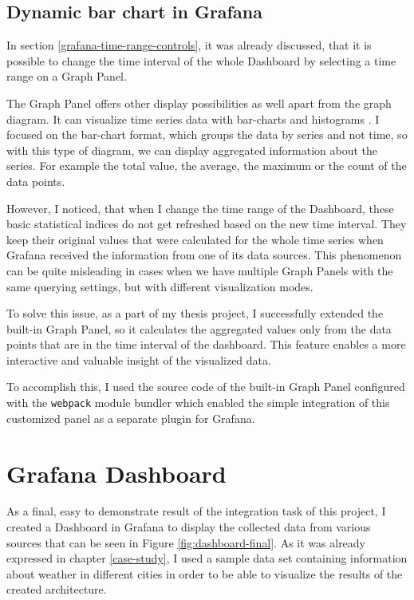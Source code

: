 \subsection{Dynamic bar chart in Grafana} \label{dynamic-barchart}

In section \ref{grafana-time-range-controls}, it was already discussed, that it is possible to change the time interval of the whole Dashboard by selecting a time range on a Graph Panel.

The Graph Panel offers other display possibilities as well apart from the graph diagram. It can visualize time series data with bar-charts and histograms \cite{graph-panel}. I focused on the bar-chart format, which groups the data by series and not time, so with this type of diagram, we can display aggregated information about the series. For example the total value, the average, the maximum or the count of the data points.

However, I noticed, that when I change the time range of the Dashboard, these basic statistical indices do not get refreshed based on the new time interval. They keep their original values that were calculated for the whole time series when Grafana received the information from one of its data sources. This phenomenon can be quite misleading in cases when we have multiple Graph Panels with the same querying settings, but with different visualization modes.

To solve this issue, as a part of my thesis project, I successfully extended the built-in Graph Panel, so it calculates the aggregated values only from the data points that are in the time interval of the dashboard. This feature enables a more interactive and valuable insight of the visualized data.

To accomplish this, I used the source code of the built-in Graph Panel configured with the \texttt{webpack} module bundler which enabled the simple integration of this customized panel as a separate plugin for Grafana. \cite{graph-panel-webpack}

\section{Grafana Dashboard} \label{final-dashboard}

As a final, easy to demonstrate result of the integration task of this project, I created a Dashboard in Grafana to display the collected data from various sources that can be seen in Figure \ref{fig:dashboard-final}. As it was already expressed in chapter \ref{case-study}, I used a sample data set containing information about weather in different cities in order to be able to visualize the results of the created architecture.


